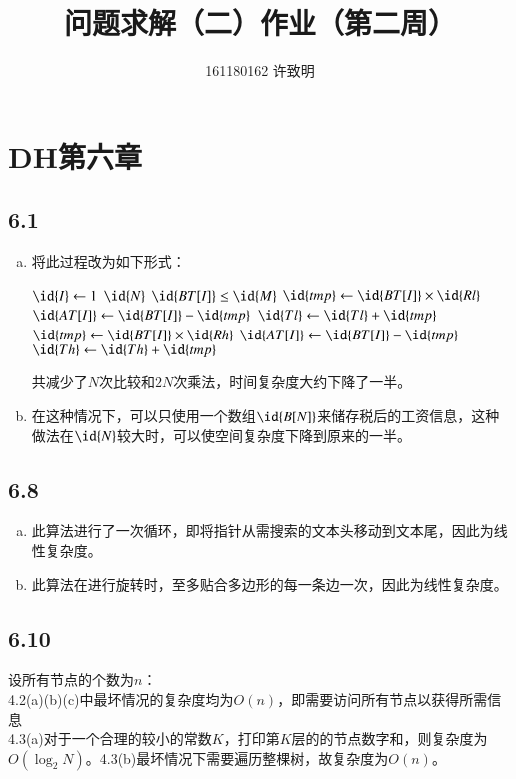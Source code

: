 \documentclass[twocolumn]{article}
\begin{document}
	\title{问题求解（二）作业（第二周）}\author{161180162 许致明}\maketitle
	\section*{DH第六章}
	\subsection*{6.1}
	\begin{enumerate}[(a)]
		\item 将此过程改为如下形式：
		\begin{codebox}
			\zi 
			\li
			\For $\id{I}\gets 1$ \To $\id{N}$\Do\li 
			\If $\id{BT[I]}\le \id{M}$\Do\li 
			$\id{tmp}\gets \id{BT[I]}\times \id{Rl}$\li 
			$\id{AT[I]}\gets \id{BT[I]}-\id{tmp}$\li 
			$\id{Tl}\gets \id{Tl}+\id{tmp}$\li 
			\Else\li 
			$\id{tmp}\gets \id{BT[I]}\times \id{Rh}$\li 
			$\id{AT[I]}\gets \id{BT[I]}-\id{tmp}$\li 
			$\id{Th}\gets \id{Th}+\id{tmp}$\End  
		\end{codebox}
	共减少了$N$次比较和$2N$次乘法，时间复杂度大约下降了一半。
	\item 在这种情况下，可以只使用一个数组$\id{B[N]}$来储存税后的工资信息，这种做法在$\id{N}$较大时，可以使空间复杂度下降到原来的一半。
	\end{enumerate}
	\subsection*{6.8}
	\begin{enumerate}[(a)]
		\item 此算法进行了一次循环，即将指针从需搜索的文本头移动到文本尾，因此为线性复杂度。
		\item 此算法在进行旋转时，至多贴合多边形的每一条边一次，因此为线性复杂度。
	\end{enumerate}
	\subsection*{6.10}
	设所有节点的个数为$n$：\\
	4.2(a)(b)(c)中最坏情况的复杂度均为$O(n)$，即需要访问所有节点以获得所需信息\\
	4.3(a)对于一个合理的较小的常数$K$，打印第$K$层的的节点数字和，则复杂度为$O(\log_2 N)$。4.3(b)最坏情况下需要遍历整棵树，故复杂度为$O(n)$。
\end{document}
